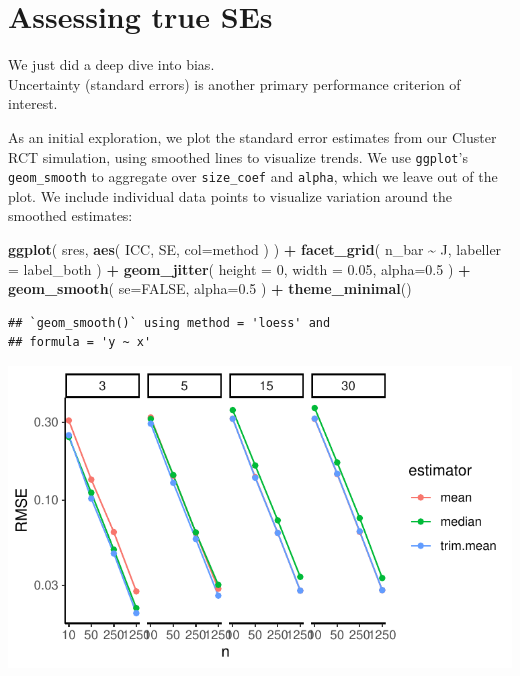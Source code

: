 \documentclass[
]{book}
\newenvironment{Shaded}{\begin{snugshade}}{\end{snugshade}}
\newcommand{\AttributeTok}[1]{\textcolor[rgb]{0.13,0.29,0.53}{#1}}
\newcommand{\ConstantTok}[1]{\textcolor[rgb]{0.56,0.35,0.01}{#1}}
\newcommand{\DecValTok}[1]{\textcolor[rgb]{0.00,0.00,0.81}{#1}}
\newcommand{\FloatTok}[1]{\textcolor[rgb]{0.00,0.00,0.81}{#1}}
\newcommand{\FunctionTok}[1]{\textcolor[rgb]{0.13,0.29,0.53}{\textbf{#1}}}
\newcommand{\NormalTok}[1]{#1}
\newcommand{\SpecialCharTok}[1]{\textcolor[rgb]{0.81,0.36,0.00}{\textbf{#1}}}
\begin{document}
\section{Assessing true SEs}\label{assessing-true-ses}

We just did a deep dive into bias.\\
Uncertainty (standard errors) is another primary performance criterion of interest.

As an initial exploration, we plot the standard error estimates from our Cluster RCT simulation, using smoothed lines to visualize trends. We use \texttt{ggplot}'s \texttt{geom\_smooth} to aggregate over \texttt{size\_coef} and \texttt{alpha}, which we leave out of the plot.
We include individual data points to visualize variation around the smoothed estimates:

\begin{Shaded}
\begin{Highlighting}[]
\FunctionTok{ggplot}\NormalTok{( sres, }\FunctionTok{aes}\NormalTok{( ICC, SE, }\AttributeTok{col=}\NormalTok{method ) ) }\SpecialCharTok{+}
  \FunctionTok{facet\_grid}\NormalTok{( n\_bar }\SpecialCharTok{\textasciitilde{}}\NormalTok{  J, }\AttributeTok{labeller =}\NormalTok{ label\_both ) }\SpecialCharTok{+}
  \FunctionTok{geom\_jitter}\NormalTok{( }\AttributeTok{height =} \DecValTok{0}\NormalTok{, }\AttributeTok{width =} \FloatTok{0.05}\NormalTok{, }\AttributeTok{alpha=}\FloatTok{0.5}\NormalTok{ ) }\SpecialCharTok{+}
  \FunctionTok{geom\_smooth}\NormalTok{( }\AttributeTok{se=}\ConstantTok{FALSE}\NormalTok{, }\AttributeTok{alpha=}\FloatTok{0.5}\NormalTok{ ) }\SpecialCharTok{+}
  \FunctionTok{theme\_minimal}\NormalTok{()}
\end{Highlighting}
\end{Shaded}

\begin{verbatim}
## `geom_smooth()` using method = 'loess' and
## formula = 'y ~ x'
\end{verbatim}

\begin{center}\includegraphics[width=0.75\linewidth]{Designing-Simulations-in-R_files/figure-latex/unnamed-chunk-177-1} \end{center}
\end{document}
